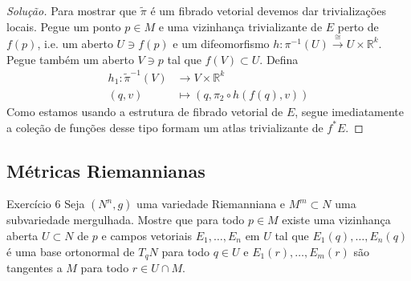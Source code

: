 \begin{proof}[Solução]\leavevmode
Para mostrar que \(\tilde{\pi}\) é um fibrado vetorial devemos dar trivializações locais. Pegue um ponto \(p \in M\) e uma vizinhança trivializante de \(E\) perto de \(f(p)\), i.e. um aberto \(U \ni f(p)\) e um difeomorfismo \(h:\pi^{-1}(U)\xrightarrow{\cong}U\times \mathbb{R}^k\). Pegue também um aberto \(V \ni p\) tal que \(f(V) \subset U\). Defina
\begin{align*}
	h_1: \tilde{\pi}^{-1}(V) &\longrightarrow V \times \mathbb{R}^k \\
	(q,v) &\longmapsto (q,\pi_2\circ h(f(q),v))
\end{align*}
Como estamos usando a estrutura de fibrado vetorial de \(E\), segue imediatamente a coleção de funções desse tipo formam um atlas trivializante de \(f^*E\).
\end{proof}

\subsection{Métricas Riemannianas}

\begin{thing4}{Exercício 6}\label{exer:6}\leavevmode
Seja \((N^n,g)\) uma variedade Riemanniana e \(M^m \subset N\) uma subvariedade mergulhada. Mostre que para todo \(p \in M\) existe uma vizinhança aberta \(U \subset N\) de \(p\) e campos vetoriais \(E_1,\ldots,E_n\) em \(U\) tal que \(E_1(q),\ldots,E_n(q)\) é uma base ortonormal de \(T_q N\) para todo \(q \in U\) e \(E_1(r),\ldots,E_m(r)\) são tangentes a \(M\) para todo \(r \in U \cap M\).
\end{thing4}

